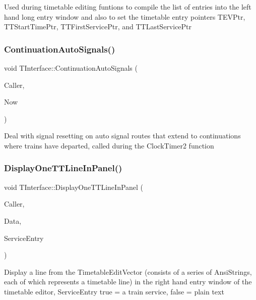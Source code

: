 Used during timetable editing funtions to compile the list of entries into the left hand long entry window and also to set the timetable entry pointers T\+E\+V\+Ptr, T\+T\+Start\+Time\+Ptr, T\+T\+First\+Service\+Ptr, and T\+T\+Last\+Service\+Ptr \mbox{\label{class_t_interface_abfdbbb1cf793f965f8c6ce60d4bb46ae}} 
\subsubsection{\texorpdfstring{Continuation\+Auto\+Signals()}{ContinuationAutoSignals()}}
{\footnotesize\ttfamily void T\+Interface\+::\+Continuation\+Auto\+Signals (\begin{DoxyParamCaption}\item[{int}]{Caller,  }\item[{T\+Date\+Time}]{Now }\end{DoxyParamCaption})\hspace{0.3cm}{\ttfamily [private]}}

Deal with signal resetting on auto signal routes that extend to continuations where trains have departed, called during the Clock\+Timer2 function \mbox{\label{class_t_interface_a1181c865da8cea56e6f0af6b31a88db0}} 
\subsubsection{\texorpdfstring{Display\+One\+T\+T\+Line\+In\+Panel()}{DisplayOneTTLineInPanel()}}
{\footnotesize\ttfamily void T\+Interface\+::\+Display\+One\+T\+T\+Line\+In\+Panel (\begin{DoxyParamCaption}\item[{int}]{Caller,  }\item[{Ansi\+String}]{Data,  }\item[{bool}]{Service\+Entry }\end{DoxyParamCaption})\hspace{0.3cm}{\ttfamily [private]}}

Display a line from the Timetable\+Edit\+Vector (consists of a series of Ansi\+Strings, each of which represents a timetable line) in the right hand entry window of the timetable editor, Service\+Entry true = a train service, false = plain text \mbox{\label{class_t_interface_a2bb21fd8e1e90095cf68d63a57e938ec}} 
